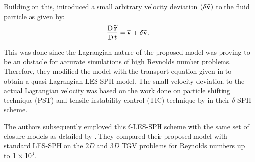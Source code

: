 Building on this, \cite{Colagrossi2021QuasiLagrangian} introduced a small arbitrary velocity deviation $(\delta\widetilde{\mathbf{v}})$ to the fluid particle as given by:
\begin{equation}
    \frac{\operatorname{D} \widetilde{\mathbf{r}}}{\operatorname{D} t} = \widetilde{\mathbf{v}} + \delta\widetilde{\mathbf{v}}.
    \label{eq:Colagrossi2021QuasiLagrangian-r-transport}
\end{equation}

This was done since the Lagrangian nature of the proposed model was proving to be an obstacle for accurate simulations of high Reynolds number problems. Therefore, they modified the model with the transport equation given in  to obtain a quasi-Lagrangian LES-SPH model. The small velocity deviation to the actual Lagrangian velocity was based on the work done on particle shifting technique (PST) and tensile instability control (TIC) technique by \cite{sun2018multi} in their $\delta$-SPH scheme.

The authors subsequently employed this $\delta$-LES-SPH scheme with the same set of closure models as detailed by \cite{DiMascio2017}. They compared their proposed model with standard LES-SPH on the $2D$ and $3D$ TGV problems for Reynolds numbers up to $1 \times {10}^{6}$.

